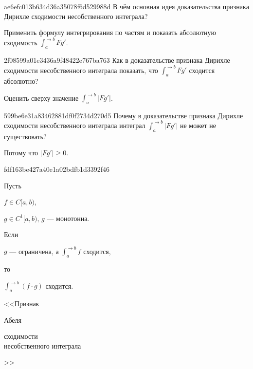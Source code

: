 \begin{note}{ae6efc013b634d36a35078f6d529988d}
    В чём основная идея доказательства признака Дирихле сходимости несобственного интеграла?

    \begin{cloze}{1}
        Применить формулу интегрирования по частям и показать абсолютную сходимость \({ \int_{a}^{\to b} Fg' }\).
    \end{cloze}
\end{note}

\begin{note}{2f08599a01e3436a9f48422e767ba763}
    Как в доказательстве признака Дирихле сходимости несобственного интеграла показать, что \({ \int_{a}^{\to b} Fg' }\) сходится абсолютно?

    \begin{cloze}{1}
        Оценить сверху значение \({ \int_{a}^{\to b} \left\lvert F g' \right\rvert }\).
    \end{cloze}
\end{note}

\begin{note}{599be6e31a83462881df0f2734d270d5}
    Почему в доказательстве признака Дирихле сходимости несобственного интеграла интеграл \({ \int_{a}^{\to b} \left\lvert Fg' \right\rvert }\) не может не существовать?

    \begin{cloze}{1}
        Потому что \({ \left\lvert F g' \right\rvert \geqslant 0 }\).
    \end{cloze}
\end{note}

\begin{note}{fdf163be427a40e1a02bdfb1d3392f46}

    Пусть \begin{icloze}{4}\({ f \in C[a, b) }\),\end{icloze} \begin{icloze}{3}\({ g \in C^{1}[a, b) }\),\: \({ g }\) --- монотонна.\end{icloze} Если
    \begin{icloze}{1}
        \({ g }\) --- ограничена, а \({ \int_{a}^{\to b} f }\) сходится,
    \end{icloze}
    то \begin{icloze}{2}\({ \int_{a}^{\to b} (f \cdot g) }\) сходится.\end{icloze}

    \begin{center}
        \tiny
        <<Признак \begin{icloze}{5}Абеля\end{icloze} \begin{icloze}{2}сходимости \\\phantom{<<}несобственного интеграла\end{icloze}>>
    \end{center}
\end{note}

